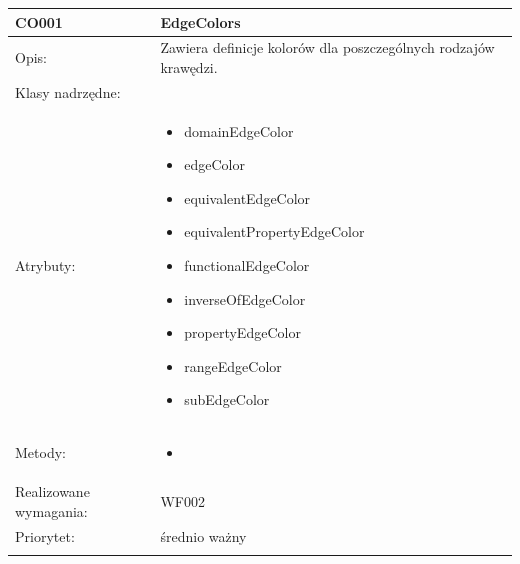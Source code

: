 \documentclass[a4paper,10pt]{article}
\begin{document}
\begin{center}
 


\begin{longtable}{|m{3cm}|m{9cm}|} \hline

CO001 & EdgeColors \\ \hline
Opis: & Zawiera definicje kolorów dla poszczególnych rodzajów krawędzi.   \\ \hline
Klasy nadrzędne: &     \\ \hline
Atrybuty: & \begin{itemize}
 \item domainEdgeColor
 \item edgeColor
 \item equivalentEdgeColor
 \item equivalentPropertyEdgeColor
 \item functionalEdgeColor
 \item inverseOfEdgeColor
 \item propertyEdgeColor
 \item rangeEdgeColor
 \item subEdgeColor

\end{itemize}
 \\ \hline
Metody: & \begin{itemize}
 \item 
\end{itemize}
  \\ \hline
Realizowane wymagania: & WF002 \\ \hline
Priorytet: & średnio ważny \\ \hline

\multicolumn{2}{c}{} \\
 \hline


\end{longtable}
\end{center}
\end{document}
